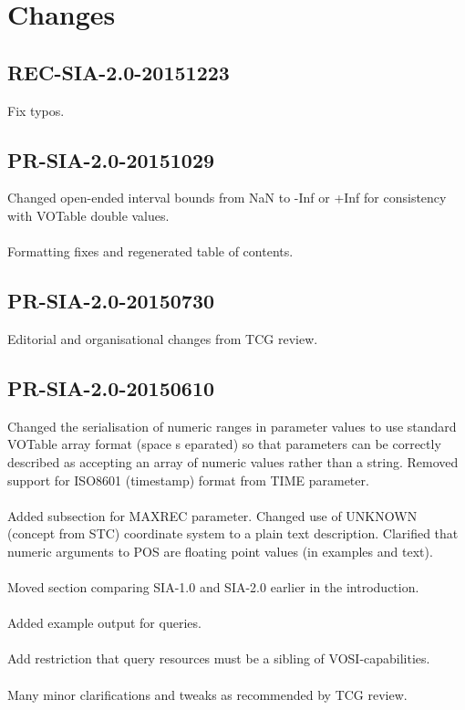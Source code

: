 \documentclass[11pt,a4paper]{ivoa}
\begin{document}
\section{Changes}
\subsection{REC-SIA-2.0-20151223}
Fix typos.
\subsection{PR-SIA-2.0-20151029}
Changed open-ended interval bounds from NaN to -Inf or +Inf for consistency with VOTable double values. \\ \\
Formatting fixes and regenerated table of contents.
\subsection{PR-SIA-2.0-20150730}
Editorial and organisational changes from TCG review.
\subsection{PR-SIA-2.0-20150610}
Changed the serialisation of numeric ranges in parameter values to use standard VOTable array format (space s eparated) so that parameters can be correctly described as accepting an array of numeric values rather than a string. Removed support for ISO8601 (timestamp) format from TIME parameter. \\ \\
Added subsection for MAXREC parameter. Changed use of UNKNOWN (concept from STC) coordinate system to a plain text description. Clarified that numeric arguments to POS are floating point values (in examples and text). \\ \\
Moved section comparing SIA-1.0 and SIA-2.0 earlier in the introduction. \\ \\
Added example output for queries. \\ \\
Add restriction that {query} resources must be a sibling of VOSI-capabilities. \\ \\
Many minor clarifications and tweaks as recommended by TCG review.
\end{document}

